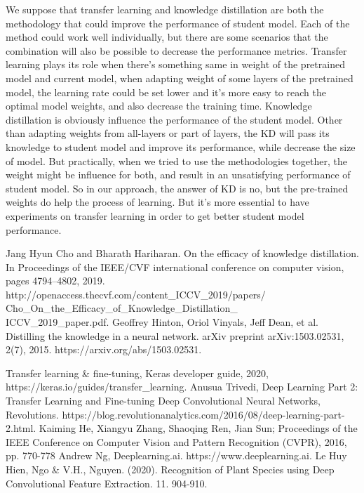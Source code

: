 \documentclass[conference]{IEEEtran}
\begin{document}
We suppose that transfer learning and knowledge distillation are both the methodology that could improve the performance of student model. Each of the method could work well individually, but there are some scenarios that the combination will also be possible to decrease the performance metrics. Transfer learning plays its role when there's something same in weight of the pretrained model and current model, when adapting weight of some layers of the pretrained model, the learning rate could be set lower and it's more easy to reach the optimal model weights, and also decrease the training time. Knowledge distillation is obviously influence the performance of the student model. Other than adapting weights from all-layers or part of layers, the KD will pass its knowledge to student model and improve its performance, while decrease the size of model. But practically, when we tried to use the methodologies together, the weight might be influence for both, and result in an unsatisfying performance of student model. So in our approach, the answer of KD is no, but the pre-trained weights do help the process of learning. But it's more essential to have experiments on transfer learning in order to get better student model performance.

\begin{thebibliography}{00}


 Jang Hyun Cho and Bharath Hariharan. On the efficacy of knowledge distillation. In Proceedings of the IEEE/CVF international conference on computer vision, pages 4794–4802, 2019. http://openaccess.thecvf.com/content\_ICCV\_2019/papers/\\Cho\_On\_the\_Efficacy\_of\_Knowledge\_Distillation\_\\ICCV\_2019\_paper.pdf.
 Geoffrey Hinton, Oriol Vinyals, Jeff Dean, et al. Distilling the knowledge in a neural network. arXiv preprint arXiv:1503.02531, 2(7), 2015. https://arxiv.org/abs/1503.02531.

 Transfer learning \& fine-tuning, Keras developer guide, 2020, https://keras.io/guides/transfer\_learning.
 Anusua Trivedi, Deep Learning Part 2: Transfer Learning and Fine-tuning Deep Convolutional Neural Networks, Revolutions. https://blog.revolutionanalytics.com/2016/08/deep-learning-part-2.html.
 Kaiming He, Xiangyu Zhang, Shaoqing Ren, Jian Sun; Proceedings of the IEEE Conference on Computer Vision and Pattern Recognition (CVPR), 2016, pp. 770-778
 Andrew Ng, Deeplearning.ai. https://www.deeplearning.ai.
Le Huy Hien, Ngo \& V.H., Nguyen. (2020). Recognition of Plant Species using Deep Convolutional Feature Extraction. 11. 904-910.
\end{thebibliography}
\end{document}

